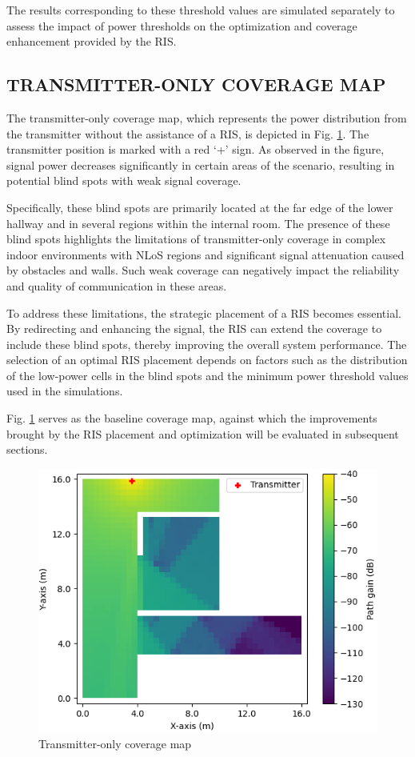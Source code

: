 \documentclass{IEEEoj}
\begin{document}
The results corresponding to these threshold values are simulated separately to assess the impact of power thresholds on the optimization and coverage enhancement provided by the RIS.

\subsection{TRANSMITTER-ONLY COVERAGE MAP}
The transmitter-only coverage map, which represents the power distribution from the transmitter without the assistance of a RIS, is depicted in Fig. \ref{TX_coverage_map}. The transmitter position is marked with a red `+' sign. As observed in the figure, signal power decreases significantly in certain areas of the scenario, resulting in potential blind spots with weak signal coverage.

Specifically, these blind spots are primarily located at the far edge of the lower hallway and in several regions within the internal room. The presence of these blind spots highlights the limitations of transmitter-only coverage in complex indoor environments with NLoS regions and significant signal attenuation caused by obstacles and walls. Such weak coverage can negatively impact the reliability and quality of communication in these areas.

To address these limitations, the strategic placement of a RIS becomes essential. By redirecting and enhancing the signal, the RIS can extend the coverage to include these blind spots, thereby improving the overall system performance. The selection of an optimal RIS placement depends on factors such as the distribution of the low-power cells in the blind spots and the minimum power threshold values used in the simulations.

Fig. \ref{TX_coverage_map} serves as the baseline coverage map, against which the improvements brought by the RIS placement and optimization will be evaluated in subsequent sections.

\begin{figure}
	\centering \includegraphics[width=\linewidth]{Sim_Results/TX_coverage_map.png}
	\caption{Transmitter-only coverage map}
	\label{TX_coverage_map}
\end{figure}
\end{document}
